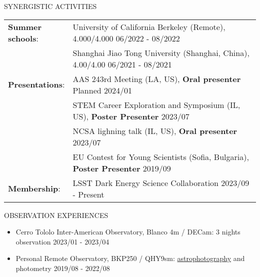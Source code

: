 \documentclass[10pt]{article} %
\begin{document}
\begin{section}{SYNERGISTIC ACTIVITIES}

\begin{tabular}{@{}p{0.2\linewidth}@{}p{0.8\linewidth}@{}}
    \textbf{Summer schools}: & University of California Berkeley (Remote), 4.000/4.000  \hfill 06/2022 - 08/2022\\
    & Shanghai Jiao Tong University (Shanghai, China), 4.00/4.00 \hfill 06/2021 - 08/2021\\
    \textbf{Presentations}: & AAS 243rd Meeting (LA, US), \textbf{Oral presenter} \hfill Planned 2024/01  \\
    & STEM Career Exploration and Symposium (IL, US), \textbf{Poster Presenter} \hfill 2023/07  \\
    & NCSA lighning talk (IL, US), \textbf{Oral presenter} \hfill 2023/07 \\
    & EU Contest for Young Scientists (Sofia, Bulgaria), \textbf{Poster Presenter} \hfill 2019/09 \\
    \textbf{Membership}: &LSST Dark Energy Science Collaboration \hfill 2023/09 - Present \\
\end{tabular}

\end{section}

\begin{section}{OBSERVATION EXPERIENCES}
    
\begin{itemize}[leftmargin=1.5em]
    \item Cerro Tololo Inter-American Observatory, Blanco 4m / DECam: 3 nights observation \hfill 2023/01 - 2023/04
    \item Personal Remote Observatory, BKP250 / QHY9sm: \href{https://yliu.fit/astrophotography/}{astrophotography} and photometry \hfill 2019/08 - 2022/08
\end{itemize}

\end{section}
\end{document}

